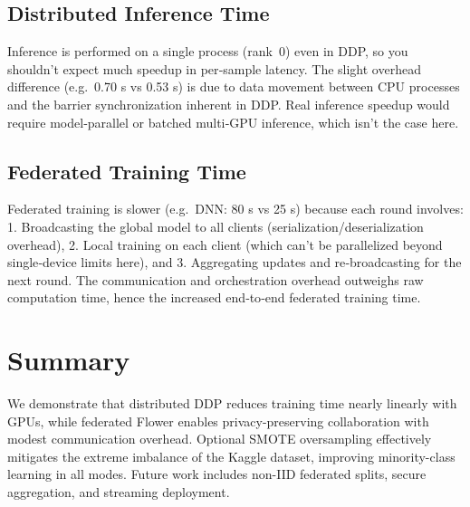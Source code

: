 \documentclass[10pt]{article}
\begin{document}
\subsection*{Distributed Inference Time}
Inference is performed on a single process (rank 0) even in DDP, so you shouldn’t expect much speedup in per‐sample latency. The slight overhead difference (e.g.\ 0.70 s vs 0.53 s) is due to data movement between CPU processes and the barrier synchronization inherent in DDP. Real inference speedup would require model‐parallel or batched multi‐GPU inference, which isn’t the case here.

\subsection*{Federated Training Time}
Federated training is slower (e.g.\ DNN: 80 s vs 25 s) because each round involves:  
1. Broadcasting the global model to all clients (serialization/deserialization overhead),  
2. Local training on each client (which can’t be parallelized beyond single‐device limits here), and  
3. Aggregating updates and re‐broadcasting for the next round.  
The communication and orchestration overhead outweighs raw computation time, hence the increased end‐to‐end federated training time.

  

\section*{Summary}
We demonstrate that distributed DDP reduces training time nearly linearly with GPUs, while federated Flower enables privacy-preserving collaboration with modest communication overhead. Optional SMOTE oversampling effectively mitigates the extreme imbalance of the Kaggle dataset, improving minority-class learning in all modes. Future work includes non-IID federated splits, secure aggregation, and streaming deployment.
\end{document}
